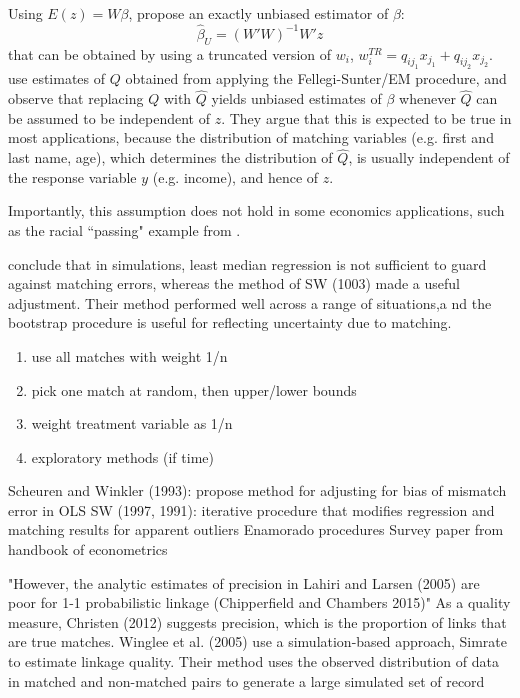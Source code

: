 \documentclass[12pt]{article}
\begin{document}
Using $E(z) = W\beta$, \cite{lahiri05} propose an exactly unbiased estimator of $\beta$:
$$ \hat{\beta}_U = (W'W)^{-1} W'z$$ 
that can be obtained by using a truncated version of $w_i$, $w_i^{TR} = q_{ij_1} x_{j_1} + q_{ij_2} x_{j_2}$.   \cite{lahiri05} use estimates of $Q$ obtained from applying the Fellegi-Sunter/EM procedure, and observe that replacing $Q$ with $\hat{Q}$ yields unbiased estimates of $\beta$ whenever $\hat{Q}$ can be assumed to be independent of $z$.  They argue that this is expected to be true in most applications, because the distribution of matching variables (e.g. first and last name, age), which determines the distribution of $\hat{Q}$, is usually independent of the response variable $y$ (e.g. income), and hence of $z$.  

Importantly, this assumption does not hold in some economics applications, such as the racial ``passing" example from \cite{nq2015}. 

\cite{lahiri05} conclude that in simulations, least median regression is not sufficient to guard against matching errors, whereas the method of SW (1003) made a useful adjustment.  Their method performed well across a range of situations,a nd the bootstrap procedure is useful for reflecting uncertainty due to matching.  


\begin{enumerate}
\item \cite{ahl2019} use all matches with weight 1/n 
\item \cite{nq2015} pick one match at random, then upper/lower bounds
\item  \cite{bleakley2016} weight treatment variable as 1/n
\item exploratory methods (if time)
\end{enumerate}


 Scheuren and Winkler (1993): propose method for adjusting for bias of mismatch error in OLS
 SW (1997, 1991): iterative procedure that modifies regression and matching results for apparent outliers 
 Enamorado procedures
 Survey paper from handbook of econometrics
 
 "However, the analytic estimates of precision in Lahiri
and Larsen (2005) are poor for 1-1 probabilistic linkage (Chipperfield and Chambers
2015)"   As a quality measure, Christen (2012) suggests precision, which is the proportion of
links that are true matches. Winglee et al. (2005) use a simulation-based approach,
Simrate to estimate linkage quality. Their method uses the observed distribution of
data in matched and non-matched pairs to generate a large simulated set of record 
\end{document}
